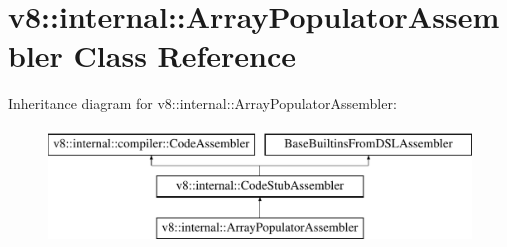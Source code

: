 \hypertarget{classv8_1_1internal_1_1ArrayPopulatorAssembler}{}\section{v8\+:\+:internal\+:\+:Array\+Populator\+Assembler Class Reference}
\label{classv8_1_1internal_1_1ArrayPopulatorAssembler}
Inheritance diagram for v8\+:\+:internal\+:\+:Array\+Populator\+Assembler\+:\begin{figure}[H]
\begin{center}
\leavevmode
\includegraphics[height=3.000000cm]{classv8_1_1internal_1_1ArrayPopulatorAssembler}
\end{center}
\end{figure}
